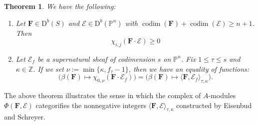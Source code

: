 \documentclass[12pt]{amsart}
\newtheorem{thm}[lemma]{Theorem}
\theoremstyle{definition}
\theoremstyle{remark}
\newcommand{\codim}{\operatorname{codim}}
\newcommand{\PP}{\mathbb{P}}
\newcommand{\HH}{\mathrm{H}}
\newcommand{\ZZ}{\mathbb{Z}}
\newcommand{\QQ}{\mathbb{Q}}
\newcommand{\VV}{\mathrm{V}}
\newcommand{\cE}{\mathcal{E}}
\newcommand{\FF}{\mathbf{F}}
\newcommand{\Gbull}{\mathbf{G}}
\newcommand{\DD}{\mathrm{D}}
\begin{document}
\begin{thm}\label{thm:categorified}
We have the following:
\begin{enumerate}
	\item\label{thm:categorified:1}  Let $\FF\in \DD^b(S)$ and $\cE\in \DD^b(\PP^n)$ with $\codim(\FF)+\codim(\cE)\geq n+1$.  Then
\[
\chi_{i,j}(\FF\cdot \cE)\geq 0
\]
	\item\label{thm:categorified:2}  Let $\cE_{f}$ be a supernatural sheaf of codimension $s$ on $\PP^n$.  Fix $1\leq \tau \leq s$ and $\kappa\in \ZZ$.  If we set $\nu:=\min\{\kappa, f_{\tau}-1\}$,
	then we have an equality of functions:
\[
\bigg( \beta(\FF)\mapsto \chi_{0,\nu}(\FF\cdot \cE_f)\bigg) =\bigg( \beta(\FF)\mapsto \langle \FF, \cE_f\rangle_{\tau,\kappa} \bigg).
\]
\end{enumerate}
\end{thm}
The above theorem illustrates the sense in which the complex of $A$-modules $\Phi(\FF,\cE)$ categorifies the nonnegative integers $\langle \FF,\cE\rangle_{\tau,\kappa}$ constructed by Eisenbud and Schreyer.

%
\end{document}
